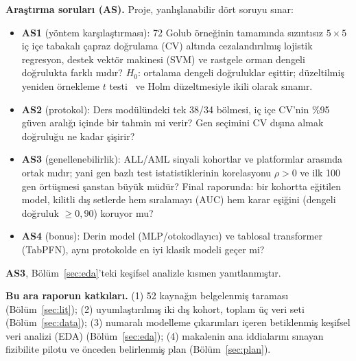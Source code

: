 \documentclass[conference]{IEEEtran}
\newcommand{\AS}[1]{\textbf{AS#1}}
\begin{document}
\textbf{Araştırma soruları (AS).} Proje, yanlışlanabilir dört soruyu sınar:
\begin{itemize}
\item \AS{1} (yöntem karşılaştırması): 72 Golub örneğinin tamamında sızıntısız $5\times5$ iç içe
tabakalı çapraz doğrulama (CV) altında cezalandırılmış lojistik regresyon, destek vektör makinesi
(SVM) ve rastgele orman dengeli doğrulukta farklı mıdır? $H_0$: ortalama dengeli doğruluklar
eşittir; düzeltilmiş yeniden örnekleme $t$ testi~\cite{nadeau2003} ve Holm düzeltmesiyle ikili
olarak sınanır.
\item \AS{2} (protokol): Ders modülündeki tek 38/34 bölmesi, iç içe CV'nin \%95 güven aralığı
içinde bir tahmin mi verir? Gen seçimini CV dışına almak doğruluğu ne kadar şişirir?
\item \AS{3} (genellenebilirlik): ALL/AML sinyali kohortlar ve platformlar arasında ortak mıdır;
yani gen bazlı test istatistiklerinin korelasyonu $\rho>0$ ve ilk 100 gen örtüşmesi şanstan büyük
müdür? Final raporunda: bir kohortta eğitilen model, kilitli dış setlerde hem sıralamayı (AUC) hem
karar eşiğini (dengeli doğruluk $\geq 0{,}90$) koruyor mu?
\item \AS{4} (bonus): Derin model (MLP/otokodlayıcı) ve tablosal transformer (TabPFN), aynı
protokolde en iyi klasik modeli geçer mi?
\end{itemize}
\AS{3}, Bölüm~\ref{sec:eda}'teki keşifsel analizle kısmen yanıtlanmıştır.

\textbf{Bu ara raporun katkıları.}
(1) 52 kaynağın belgelenmiş taraması (Bölüm~\ref{sec:lit}); (2) uyumlaştırılmış iki dış kohort,
toplam üç veri seti (Bölüm~\ref{sec:data}); (3) numaralı modelleme çıkarımları içeren betiklenmiş
keşifsel veri analizi (EDA) (Bölüm~\ref{sec:eda}); (4) makalenin ana iddialarını sınayan fizibilite
pilotu ve önceden belirlenmiş plan (Bölüm~\ref{sec:plan}).

\end{document}

